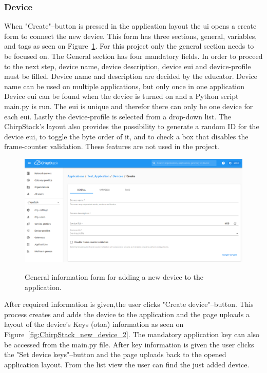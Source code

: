 \subsubsection{Device}
When "Create"--button is pressed in the application layout the \gls{ui} opens a create form to connect the new device.
This form has three sections, general, variables, and tags as seen on Figure~\ref{fig:ChirpStack_new_device}.
For this project only the general section needs to be focused on.
The General section has four mandatory fields.
In order to proceed to the next step, device name, device description, device \gls{eui} and device-profile must be filled.
Device name and description are decided by the educator.
Device name can be used on multiple applications, but only once in one application
Device \gls{eui} can be found when the device is turned on and a Python script main.py is run.
The \gls{eui} is unique and therefor there can only be one device for each \gls{eui}.
Lastly the device-profile is selected from a drop-down list.
The ChirpStack's layout also provides the possibility to generate a random ID for the device \gls{eui}, to toggle the byte order of it, and to check a box that disables the frame-counter validation.
These features are not used in the project.

\clearpage

\begin{figure}[ht]
  \centering
  {\includegraphics[width=\textwidth]{illustration/ChirpStack_new_device.png}}
  \caption{General information form for adding a new device to the application.}
  \label{fig:ChirpStack_new_device}
\end{figure}

After required information is given,the user clicks "Create device"--button.
This process creates and adds the device to the application and the page uploads a layout of the device's Keys (\gls{otaa}) information as seen on Figure~\ref{fig:ChirpStack_new_device_2}.
The mandatory application key can also be accessed from the main.py file.
After key information is given the user clicks the "Set device keys"--button and the page uploads back to the opened application layout.
From the list view the user can find the just added device.

